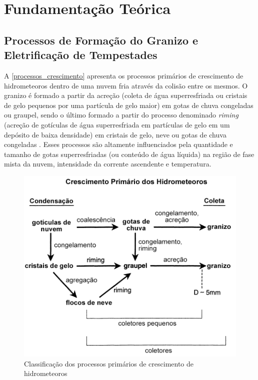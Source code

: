 \chapter{Fundamentação Teórica}\label{teoria}

\section{Processos de Formação do Granizo e Eletrificação de Tempestades}\label{granizo_eletrificacao}

A \autoref{processos_crescimento} apresenta os processos primários de crescimento de hidrometeoros dentro de uma nuvem fria através da colisão entre os mesmos. O granizo é formado a partir da acreção (coleta de água superresfriada ou cristais de gelo pequenos por uma partícula de gelo maior) em gotas de chuva congeladas ou graupel, sendo o último formado a partir do processo denominado \textit{riming} (acreção de gotículas de água superresfriada em partículas de gelo em um depósito de baixa densidade) em cristais de gelo, neve ou gotas de chuva congeladas \cite{Reinking1975}. Esses processos são altamente influenciados pela quantidade e tamanho de gotas superresfriadas (ou conteúdo de água líquida) na região de fase mista da nuvem, intensidade da corrente ascendente e temperatura.

\begin{figure}[htb]
	\begin{center}
		\caption{Classificação dos processos primários de crescimento de hidrometeoros} 
		\label{processos_crescimento}
		\includegraphics[width=0.7\columnwidth]{figs/growth_knight_ptbr.png}
	\end{center}
\end{figure}

